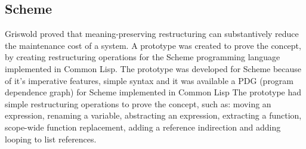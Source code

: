 





\subsection{Scheme}

Griswold \cite{griswold1991program} proved that meaning-preserving restructuring can substantively reduce the maintenance cost of a system.
A prototype was created to prove the concept, by creating restructuring operations for the Scheme programming language implemented in Common Lisp.
The prototype was developed for Scheme because of it's imperative features, simple syntax and it was available a PDG (program dependence graph) for Scheme implemented in Common Lisp
The prototype had simple restructuring operations to prove the concept, such as: moving an expression, renaming a variable, abstracting an expression, extracting a function, scope-wide function replacement, adding a reference indirection and adding looping to list references.


